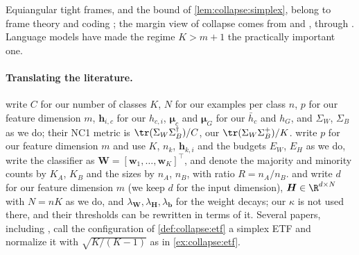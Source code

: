 \begin{refsection}
Equiangular tight frames, and the bound of \cref{lem:collapse:simplex}, belong to frame theory and coding \parencite{StrohmerHeath2003}; the margin view of collapse comes from \textcite{SoudryEtAl2018} and \textcite{LyuLi2020}, through \textcite{JiEtAl2022}. Language models have made the regime $K>m+1$ the practically important one.

\paragraph{Translating the literature.} \Textcite{PapyanHanDonoho2020} write $C$ for our number of classes $K$, $N$ for our examples per class $n$, $p$ for our feature dimension $m$, $\boldsymbol h_{i,c}$ for our $h_{c,i}$, $\boldsymbol\mu_c$ and $\boldsymbol\mu_G$ for our $\bar h_c$ and $h_G$, and $\Sigma_W$, $\Sigma_B$ as we do; their NC1 metric is $\tr(\Sigma_W\Sigma_B^\dagger)/C$, our $\tr(\Sigma_W\Sigma_B^+)/K$. \Textcite{FangEtAl2021} write $p$ for our feature dimension $m$ and use $K$, $n_k$, $\boldsymbol h_{k,i}$ and the budgets $E_W$, $E_H$ as we do, write the classifier as $\boldsymbol W=[\boldsymbol w_1,\dots,\boldsymbol w_K]^\top$, and denote the majority and minority counts by $K_A$, $K_B$ and the sizes by $n_A$, $n_B$, with ratio $R=n_A/n_B$. \Textcite{ZhuEtAl2021} and \textcite{ZhouEtAl2022} write $d$ for our feature dimension $m$ (we keep $d$ for the input dimension), $\boldsymbol H\in\R^{d\times N}$ with $N=nK$ as we do, and $\lambda_{\boldsymbol W},\lambda_{\boldsymbol H},\lambda_{\boldsymbol b}$ for the weight decays; our $\kappa$ is not used there, and their thresholds can be rewritten in terms of it. Several papers, including \textcite{FangEtAl2021}, call the configuration of \cref{def:collapse:etf} a simplex ETF and normalize it with $\sqrt{K/(K-1)}$ as in \cref{ex:collapse:etf}.

\printchapterbib
\end{refsection}
